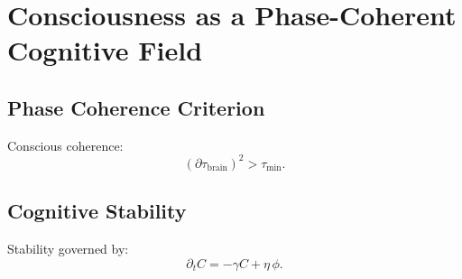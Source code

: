 \chapter{Consciousness as a Phase-Coherent Cognitive Field}

\section{Phase Coherence Criterion}
Conscious coherence:
\[
(\partial\tau_{\mathrm{brain}})^2 > \tau_{\mathrm{min}}.
\]

\section{Cognitive Stability}
Stability governed by:
\[
\partial_t C = -\gamma C + \eta\,\phi.
\]

